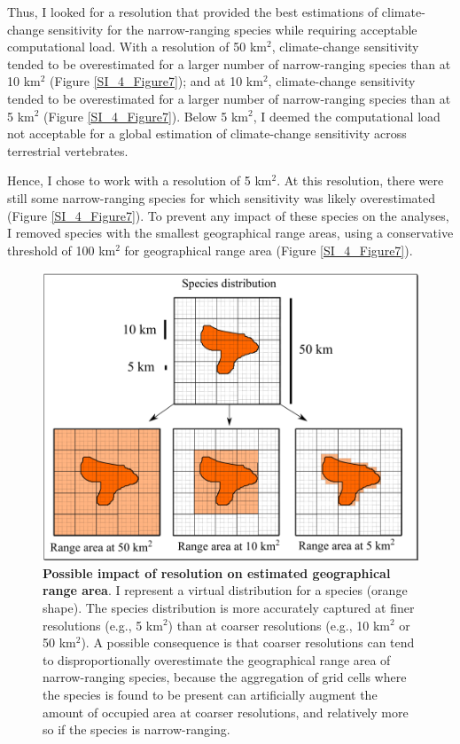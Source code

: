Thus, I looked for a resolution that provided the best estimations of climate-change sensitivity for the narrow-ranging species while requiring acceptable computational load. With a resolution of 50 km$^2$, climate-change sensitivity tended to be overestimated for a larger number of narrow-ranging species than at 10 km$^2$ (Figure \ref{SI_4_Figure7}); and at 10 km$^2$, climate-change sensitivity tended to be overestimated for a larger number of narrow-ranging species than at 5 km$^2$ (Figure \ref{SI_4_Figure7}). Below 5 km$^2$, I deemed the computational load not acceptable for a global estimation of climate-change sensitivity across terrestrial vertebrates.

Hence, I chose to work with a resolution of 5 km$^2$. At this resolution, there were still some narrow-ranging species for which sensitivity was likely overestimated (Figure \ref{SI_4_Figure7}). To prevent any impact of these species on the analyses, I removed species with the smallest geographical range areas, using a conservative threshold of 100 km$^2$ for geographical range area (Figure \ref{SI_4_Figure7}).

\vspace{0.5cm}
\begin{figure}[h!]
\centering
\includegraphics[scale=0.6]{Supporting/Chapter4/Figures/ResolutionConcept.png}
\caption[Possible impact of resolution on estimated geographical range area]{\textbf{Possible impact of resolution on estimated geographical range area}. I represent a virtual distribution for a species (orange shape). The species distribution is more accurately captured at finer resolutions (e.g., 5 km$^2$) than at coarser resolutions (e.g., 10 km$^2$ or 50 km$^2$). A possible consequence is that coarser resolutions can tend to disproportionally overestimate the geographical range area of narrow-ranging species, because the aggregation of grid cells where the species is found to be present can artificially augment the amount of occupied area at coarser resolutions, and relatively more so if the species is narrow-ranging.}
\label{SI_4_Figure6}
\end{figure}
  

